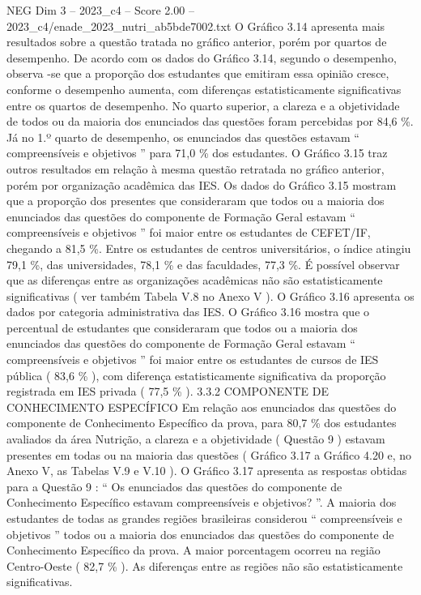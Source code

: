 \begin{textsample}{NEG Dim 3 – 2023\_c4 – Score 2.00 – 2023\_c4/enade\_2023\_nutri\_ab5bde7002.txt}
O Gráfico 3.14 apresenta mais resultados sobre a questão tratada no gráfico anterior, porém por quartos de desempenho.
De acordo com os dados do Gráfico 3.14, segundo o desempenho, observa -se que a proporção dos estudantes que emitiram essa opinião cresce, conforme o desempenho aumenta, com diferenças estatisticamente significativas entre os quartos de desempenho.
No quarto superior, a clareza e a objetividade de todos ou da maioria dos enunciados das questões foram percebidas por 84,6 \%.
Já no 1.º quarto de desempenho, os enunciados das questões estavam “ compreensíveis e objetivos ” para 71,0 \% dos estudantes.
O Gráfico 3.15 traz outros resultados em relação à mesma questão retratada no gráfico anterior, porém por organização acadêmica das IES.
Os dados do Gráfico 3.15 mostram que a proporção dos presentes que consideraram que todos ou a maioria dos enunciados das questões do componente de Formação Geral estavam “ compreensíveis e objetivos ” foi maior entre os estudantes de CEFET/IF, chegando a 81,5 \%.
Entre os estudantes de centros universitários, o índice atingiu 79,1 \%, das universidades, 78,1 \% e das faculdades, 77,3 \%.
É possível observar que as diferenças entre as organizações acadêmicas não são estatisticamente significativas ( ver também Tabela V.8 no Anexo V ).
O Gráfico 3.16 apresenta os dados por categoria administrativa das IES.
O Gráfico 3.16 mostra que o percentual de estudantes que consideraram que todos ou a maioria dos enunciados das questões do componente de Formação Geral estavam “ compreensíveis e objetivos ” foi maior entre os estudantes de cursos de IES pública ( 83,6 \% ), com diferença estatisticamente significativa da proporção registrada em IES privada ( 77,5 \% ). 3.3.2 COMPONENTE DE CONHECIMENTO ESPECÍFICO Em relação aos enunciados das questões do componente de Conhecimento Específico da prova, para 80,7 \% dos estudantes avaliados da área Nutrição, a clareza e a objetividade ( Questão 9 ) estavam presentes em todas ou na maioria das questões ( Gráfico 3.17 a Gráfico 4.20 e, no Anexo V, as Tabelas V.9 e V.10 ).
O Gráfico 3.17 apresenta as respostas obtidas para a Questão 9 : “ Os enunciados das questões do componente de Conhecimento Específico estavam compreensíveis e objetivos? ”.
A maioria dos estudantes de todas as grandes regiões brasileiras considerou “ compreensíveis e objetivos ” todos ou a maioria dos enunciados das questões do componente de Conhecimento Específico da prova.
A maior porcentagem ocorreu na região Centro-Oeste ( 82,7 \% ).
As diferenças entre as regiões não são estatisticamente significativas.

\end{textsample}
